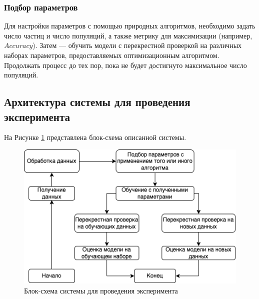 \subsubsection{Подбор параметров}

Для настройки параметров с помощью природных алгоритмов, необходимо задать число 
частиц и число популяций, а также метрику для максимизации (например, $Accuracy$). 
Затем — обучить модели с перекрестной проверкой на различных наборах
параметров, предоставляемых оптимизационным алгоритмом. Продолжать процесс 
до тех пор, пока не будет достигнуто максимальное число популяций.

\subsection{Архитектура системы для проведения эксперимента}

На Рисунке \ref{scheme} представлена блок-схема описанной системы.

\begin{figure}[H]
      \centering
      \includegraphics[width=140mm]{static/schema.png}
      \caption{Блок-схема системы для проведения эксперимента}
      \label{scheme}
\end{figure}
